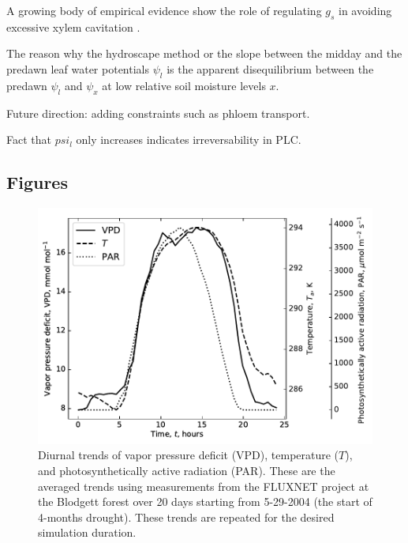\documentclass[utf8]{frontiersSCNS} %
\begin{document}
A growing body of empirical evidence show the role of regulating $g_s$ in avoiding excessive xylem cavitation \citep{tyree1988woody, jones1991stomatal, brodribb2003relations}. 

The reason why the hydroscape method \citep{meinzer2016mapping} or the slope between the midday and the predawn leaf water potentials $\psi_l$ \citep{martinez2014new} is the apparent disequilibrium between the predawn $\psi_l$ and $\psi_x$ at low relative soil moisture levels $x$.

Future direction: adding constraints such as phloem transport.

Fact that $psi_l$ only increases indicates irreversability in PLC.

\clearpage

\subsection{Figures}

\begin{figure}[h]
    \begin{center}
         \includegraphics[scale=0.75]{environment.pdf}   
    \end{center}
    \caption{Diurnal trends of vapor pressure deficit (VPD), temperature ($T$), and photosynthetically active radiation (PAR). These are the averaged trends using measurements from the FLUXNET project at the Blodgett forest over 20 days starting from 5-29-2004 (the start of 4-months drought). These trends are repeated for the desired simulation duration.}
    \label{fig:environment}
\end{figure}
\end{document}
